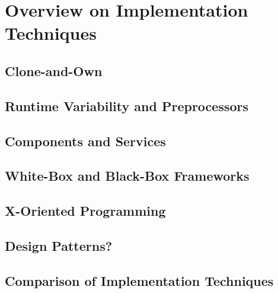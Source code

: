 \documentclass[
	aspectratio=169, %
	8pt, %
	handout, %
]{beamer}
\begin{document}
%

\lessonslearned{
	\item \ldots
}{
	\item \ldots
}{
	\ldots
}

\sectionend

\section{Overview on Implementation Techniques}

\subsection{Clone-and-Own}
\subsection{Runtime Variability and Preprocessors}
\subsection{Components and Services}
\subsection{White-Box and Black-Box Frameworks}
\subsection{X-Oriented Programming}
\subsection{Design Patterns?}
\subsection{Comparison of Implementation Techniques}

%

\end{document}

